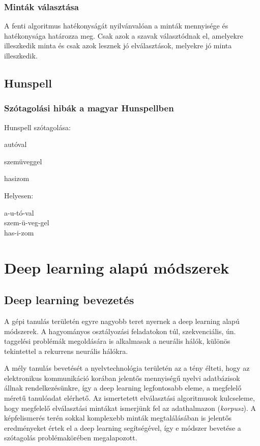 \documentclass[a4paper, magyar]{article}
\begin{document}
\subsubsection{Minták választása}
A fenti algoritmus hatékonyságát nyilvánvalóan a minták mennyisége és hatékonysága határozza meg. Csak azok a szavak választódnak el, amelyekre illeszkedik minta és csak azok lesznek jó elválasztások, melyekre jó minta illeszkedik.

\subsection{Hunspell}
\subsubsection{Szótagolási hibák a magyar Hunspellben}


\begin{minipage}{0.5\textwidth}
	Hunspell szótagolása:
\begin{checkhyphens}
	autóval
	
	szemüveggel
	
	hasizom
\end{checkhyphens} 		
\end{minipage}\noindent
\begin{minipage}{0.5\textwidth}
	Helyesen:

	a-u-tó-val\\
	szem-ü-veg-gel\\
	has-i-zom
\end{minipage}


\section{Deep learning alapú módszerek}
\subsection{Deep learning bevezetés}
A gépi tanulás területén egyre nagyobb teret nyernek a deep learning alapú módszerek. A hagyományos osztályozási feladatokon túl, szekvenciális, ún. taggelési problémák megoldására is alkalmasak a neurális hálók, különös tekintettel a rekurrens neurális hálókra.

A mély tanulás bevetését a nyelvtechnológia területén az a tény élteti, hogy az elektronikus kommunikáció korában jelentős mennyiségű nyelvi adatbázisok állnak rendelkezésünkre, így a deep learning legfontosabb eleme, a megfelelő méretű tanulóadat elérhető. Az ismertetett elválasztási algoritmusok kulcseleme, hogy megfelelő elválasztási mintákat ismerjünk fel az adathalmazon (\textit{korpusz}). A képfelismerés terén sokkal komplexebb minták megtalálásában is jelentős eredményeket értek el a deep learning segítségével, így e módszer bevetése a szótagolás problémakörében megalapozott.
\end{document}
